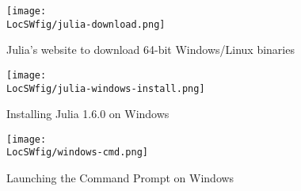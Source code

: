 \begin{figure}
      \centering
      \texttt{[image: \\LocSWfig/julia-download.png]}
      \caption{Julia's website to download 64-bit Windows/Linux binaries}
      \label{julia-download}
\end{figure}

\begin{figure}
      \centering
      \texttt{[image: \\LocSWfig/julia-windows-install.png]}
      \caption{Installing Julia 1.6.0 on Windows}
      \label{julia-windows-install}
\end{figure}

\begin{figure}
      \centering
      \texttt{[image: \\LocSWfig/windows-cmd.png]}
      \caption{Launching the Command Prompt on Windows}
      \label{windows-run-julia}
\end{figure}

